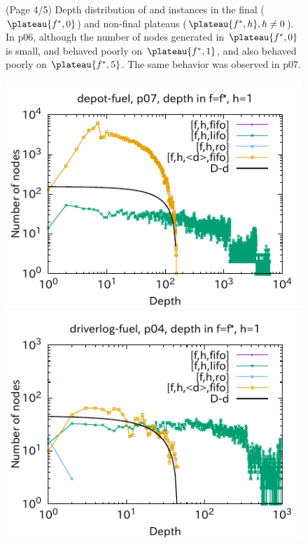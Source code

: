 \begin{figure}[htbp]
 \caption{(Page 4/5) Depth distribution of  and  instances in the final ($\plateau{f^*,0}$) and non-final plateaus ($\plateau{f^*,h}, h\not=0$). In  p06, although the number of nodes generated in $\plateau{f^*,0}$ is small, \fifo and \ro behaved poorly on $\plateau{f^*,1}$, and also \lifo behaved poorly on $\plateau{f^*,5}$. The same behavior was observed in p07.}
 \label{fig:depth-histogram4}
\end{figure}

\begin{figure}[htbp]
\includegraphics{img/output-lmcut/depot-fuel/p07-1.pdf}
\includegraphics{img/output-lmcut/driverlog-fuel/p04-1.pdf}

\end{figure}
